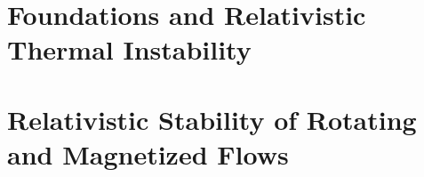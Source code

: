 \documentclass[12pt]{book}
\begin{document}
\part{Foundations and Relativistic Thermal Instability}
\label{part:foundations-thermal}


































\part{Relativistic Stability of Rotating and Magnetized Flows}
\label{part:flows}

















\end{document}
